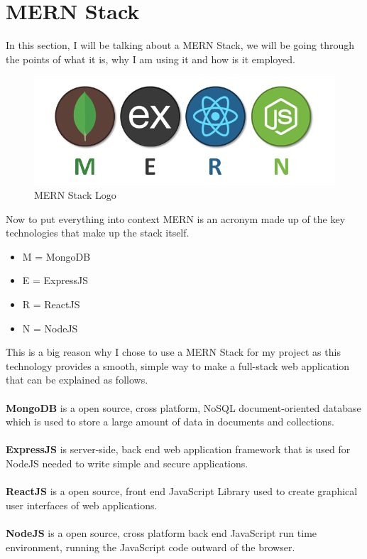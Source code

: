 \section {MERN Stack}
In this section, I will be talking about a MERN Stack, we will be going through the points of what it is, why I am using it and how is it employed.
\begin{center}
  \begin{figure}[h!]
    \includegraphics[width=\textwidth]{img/mern-stack.png}
    \caption{MERN Stack Logo}
    \label{fig: MERN Stack Image}
  \end{figure}
\end{center}
Now to put everything into context MERN is an acronym made up of the key technologies that make up the stack itself.
\begin{itemize}
\item M = MongoDB
\item E = ExpressJS
\item R = ReactJS
\item N = NodeJS
\end{itemize}
This is a big reason why I chose to use a MERN Stack for my project as this technology provides a smooth, simple way to make a full-stack web application that can be explained as follows. \\ \\
\textbf{MongoDB} is a open source, cross platform, NoSQL document-oriented database which is used to store a large amount of data in documents and collections. \\ \\
\textbf{ExpressJS} is server-side, back end web application framework that is used for NodeJS needed to write simple and secure applications. \\ \\
\textbf{ReactJS} is a open source, front end JavaScript Library used to create graphical user interfaces of web applications. \\ \\
\textbf{NodeJS} is a open source, cross platform back end JavaScript run time environment, running the JavaScript code outward of the browser. \\ \\

